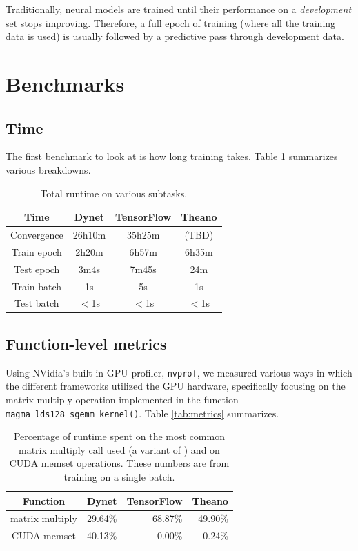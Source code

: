 \documentclass{article}
\begin{document}
Traditionally, neural models are trained until their performance on a \textit{development} set stops improving. Therefore, a full epoch of training (where all the training data is used) is usually followed by a predictive pass through development data.
\section{Benchmarks}
\subsection{Time}
The first benchmark to look at is how long training takes. Table \ref{tab:timing} summarizes various breakdowns.
\begin{table}
\begin{tabular}{c|ccc}
Time					& Dynet 		& TensorFlow 	& Theano \\ \hline
Convergence		& 26h10m 		& 35h25m 			& (TBD)\\
Train epoch 		& 2h20m		& 6h57m 			& 6h35m \\
Test epoch 		& 3m4s			& 7m45s 			& 24m \\
Train batch 		& 1s 				& 5s 					& 1s \\
Test batch 			& $<$1s 		& $<$1s 			& $<$1s \\
\end{tabular}
\caption{\label{tab:timing}Total runtime on various subtasks.}
\end{table}
\subsection{Function-level metrics}
Using NVidia's built-in GPU profiler, \verb!nvprof!, we measured various ways in which the different frameworks utilized the GPU hardware, specifically focusing on the matrix multiply operation implemented in the function \verb!magma_lds128_sgemm_kernel()!. Table \ref{tab:metrics} summarizes.

\begin{table}
\centering
\begin{tabular}{c|rrr}
\textbf{Function} & Dynet &  TensorFlow & Theano \\  
\hline
matrix multiply & 29.64\%  &  68.87\% & 49.90\% \\
\hline
CUDA memset & 40.13\% & 0.00\% & 0.24\% \\
\end{tabular}

\caption{\label{tab:pcttime}Percentage of runtime spent on the most common matrix multiply call used (a variant of \texttt{}) and on CUDA memset operations. These numbers are from training on a single batch.}
\end{table}
\end{document}
